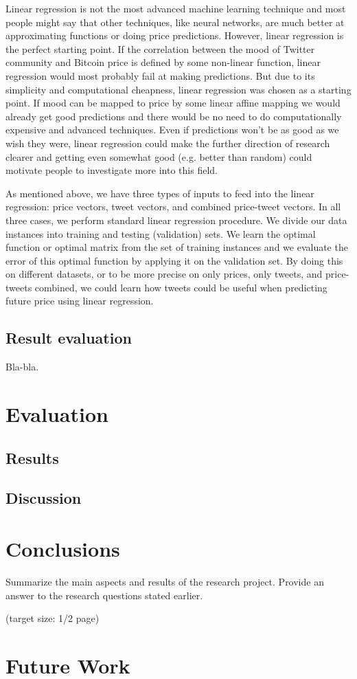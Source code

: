 \documentclass[a4paper,11pt,oneside]{article}
\begin{document}
  Linear regression is not the most advanced machine learning technique and most people might say that other techniques, like neural networks, are much better at approximating functions or doing price predictions. However, linear regression is the perfect starting point. If the correlation between the mood of Twitter community and Bitcoin price is defined by some non-linear function, linear regression would most probably fail at making predictions. But due to its simplicity and computational cheapness, linear regression was chosen as a starting point. If mood can be mapped to price by some linear affine mapping we would already get good predictions and there would be no need to do computationally expensive and advanced techniques. Even if predictions won’t be as good as we wish they were, linear regression could make the further direction of research clearer and getting even somewhat good (e.g. better than random) could motivate people to investigate more into this field. 
  
  As mentioned above, we have three types of inputs to feed into the linear regression: price vectors, tweet vectors, and combined price-tweet vectors. In all three cases, we perform standard linear regression procedure. We divide our data instances into training and testing (validation) sets. We learn the optimal function or optimal matrix from the set of training instances and we evaluate the error of this optimal function by applying it on the validation set. By doing this on different datasets, or to be more precise on only prices, only tweets, and price-tweets combined, we could learn how tweets could be useful when predicting future price using linear regression.
  
  \subsection{Result evaluation}
  
  Bla-bla.

  \section{Evaluation}

  \subsection{Results}
  
  \subsection{Discussion}

  \section{Conclusions}

  Summarize the main aspects and results of the research
  project. Provide an answer to the research questions stated earlier.

  (target size: 1/2 page)
  
  \section{Future Work}


  \newpage
  
  
\end{document}
